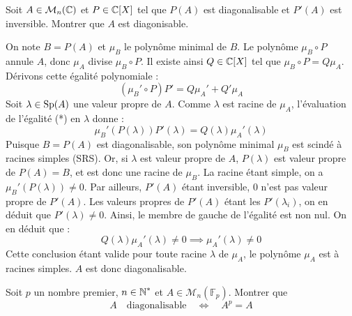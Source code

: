 \begin{exo}
	\label{reduction2}
    Soit $A\in\mathcal M_n(\operatorname{\mathbb C})$ et $P\in\operatorname{\mathbb C}[X]$ tel que $P(A)$ est diagonalisable et $P'(A)$ est inversible. Montrer que $A$ est diagonisable.
\end{exo}

\begin{solution}
    On note $B=P(A)$ et $\mu_B$ le polynôme minimal de $B$. 
    Le polynôme $\mu_B\circ P$ annule $A$, donc $\mu_A$ divise $\mu_B\circ P$. Il existe ainsi $Q\in\operatorname{\mathbb C}[X]$ tel que $\mu_B\circ P = Q\mu_A$.
    Dérivons cette égalité polynomiale :
    \[(\mu_B'\circ P)P' = Q\mu_A' + Q'\mu_A \tag{*}\]
    Soit $\lambda \in \operatorname{Sp}(A)$ une valeur propre de $A$. Comme $\lambda$ est racine de $\mu_A$, l'évaluation de l'égalité (*) en $\lambda$ donne :
    \[\mu_B'(P(\lambda))P'(\lambda) = Q(\lambda)\mu_A'(\lambda)\]
    Puisque $B = P(A)$ est diagonalisable, son polynôme minimal $\mu_B$ est scindé à racines simples (SRS). Or, si $\lambda$ est valeur propre de $A$, $P(\lambda)$ est valeur propre de $P(A) = B$, et est donc une racine de $\mu_B$. La racine étant simple, on a $\mu_B'(P(\lambda)) \neq 0$.
    Par ailleurs, $P'(A)$ étant inversible, $0$ n'est pas valeur propre de $P'(A)$. Les valeurs propres de $P'(A)$ étant les $P'(\lambda_i)$, on en déduit que $P'(\lambda) \neq 0$.
    Ainsi, le membre de gauche de l'égalité est non nul. On en déduit que :
    \[Q(\lambda)\mu_A'(\lambda) \neq 0 \implies \mu_A'(\lambda) \neq 0\]
    Cette conclusion étant valide pour toute racine $\lambda$ de $\mu_A$, le polynôme $\mu_A$ est à racines simples. $A$ est donc diagonalisable.
\end{solution}

\begin{exo}
	\label{reduction3}
    Soit $p$ un nombre premier, $n\in\operatorname{\mathbb N}^*$ et $A\in\mathcal M_n(\mathbb F_p)$. Montrer que \[A\quad \text{diagonalisable}\quad \iff\quad A^p=A\]
\end{exo}

